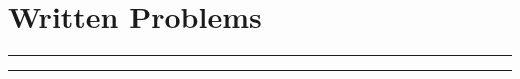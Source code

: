 \documentclass{article}
\begin{document}


\section*{Written Problems}
\noindent\rule{\textwidth}{1pt}\vspace{0.75mm}


\noindent\rule{\textwidth}{1pt}\vspace{0.75mm}


\end{document}
